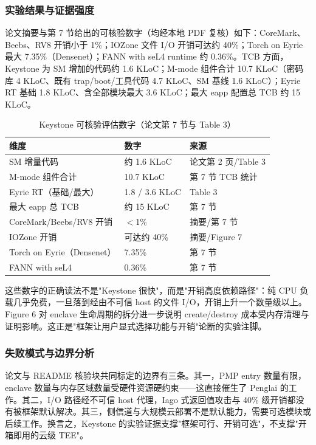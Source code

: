 \documentclass[11pt]{ctexart}
\begin{document}
\subsubsection{实验结果与证据强度}
论文摘要与第 7 节给出的可核验数字（均经本地 PDF 复核）如下：CoreMark、Beebs、RV8 开销小于 1\%；IOZone 文件 I/O 开销可达约 40\%；Torch on Eyrie 最大 7.35\%（Densenet）；FANN with seL4 runtime 约 0.36\%。TCB 方面，Keystone 为 SM 增加的代码约 1.6 KLoC；M-mode 组件合计 10.7 KLoC（密码库 4 KLoC、既有 trap/boot/工具代码 4.7 KLoC、SM 基线 1.6 KLoC）；Eyrie RT 基础 1.8 KLoC、含全部模块最大 3.6 KLoC；最大 eapp 配置总 TCB 约 15 KLoC。\par
\begin{table}[htbp]
\centering
\caption{Keystone 可核验评估数字（论文第 7 节与 Table 3）}
\begin{tabular}{lll}
\toprule
维度 & 数字 & 来源 \\
\midrule
SM 增量代码 & 约 1.6 KLoC & 论文第 2 页/Table 3 \\
M-mode 组件合计 & 10.7 KLoC & 第 7 节 TCB 统计 \\
Eyrie RT（基础/最大） & 1.8 / 3.6 KLoC & Table 3 \\
最大 eapp 总 TCB & 约 15 KLoC & 第 7 节 \\
CoreMark/Beebs/RV8 开销 & $<$1\% & 摘要/第 7 节 \\
IOZone 开销 & 可达约 40\% & 摘要/Figure 7 \\
Torch on Eyrie（Densenet） & 7.35\% & 第 7 节 \\
FANN with seL4 & 0.36\% & 第 7 节 \\
\bottomrule
\end{tabular}
\end{table}\par
这些数字的正确读法不是"Keystone 很快"，而是"开销高度依赖路径"：纯 CPU 负载几乎免费，一旦落到经由不可信 host 的文件 I/O，开销上升一个数量级以上。Figure 6 对 enclave 生命周期的拆分进一步说明 create/destroy 成本受内存清理与证明影响。这正是"框架让用户显式选择功能与开销"论断的实验注脚。\par
\subsubsection{失败模式与边界分析}
论文与 README 核验块共同标定的边界有三条。其一，PMP entry 数量有限，enclave 数量与内存区域数量受硬件资源硬约束——这直接催生了 Penglai 的工作。其二，I/O 路径经不可信 host 代理，Iago 式返回值攻击与 40\% 级开销都没有被框架默认解决。其三，侧信道与大规模云部署不是默认能力，需要可选模块或后续工作。换言之，Keystone 的实验证据支撑"框架可行、开销可选"，不支撑"开箱即用的云级 TEE"。\par
\end{document}

